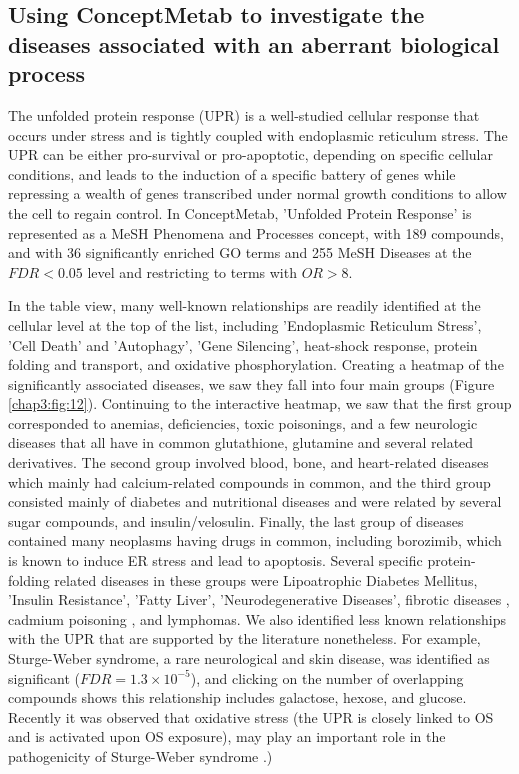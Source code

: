 \subsection{Using ConceptMetab to investigate the diseases associated with an aberrant biological process}
\label{conceptmetab_results_disease}

The unfolded protein response (UPR) is a well-studied cellular response that occurs under stress and is tightly coupled with endoplasmic reticulum stress. The UPR can be either pro-survival or pro-apoptotic, depending on specific cellular conditions, and leads to the induction of a specific battery of genes while repressing a wealth of genes transcribed under normal growth conditions to allow the cell to regain control. In ConceptMetab, 'Unfolded Protein Response' is represented as a MeSH Phenomena and Processes concept, with 189 compounds, and with 36 significantly enriched GO terms and 255 MeSH Diseases at the $FDR < 0.05$ level and restricting to terms with $OR > 8$.

In the table view, many well-known relationships are readily identified at the cellular level at the top of the list, including 'Endoplasmic Reticulum Stress', 'Cell Death' and 'Autophagy', 'Gene Silencing', heat-shock response, protein folding and transport, and oxidative phosphorylation. Creating a heatmap of the significantly associated diseases, we saw they fall into four main groups (Figure \ref{chap3:fig:12}). Continuing to the interactive heatmap, we saw that the first group corresponded to anemias, deficiencies, toxic poisonings, and a few neurologic diseases that all have in common glutathione, glutamine and several related derivatives. The second group involved blood, bone, and heart-related diseases which mainly had calcium-related compounds in common, and the third group consisted mainly of diabetes and nutritional diseases and were related by several sugar compounds, and insulin/velosulin. Finally, the last group of diseases contained many neoplasms having drugs in common, including borozimib, which is known to induce ER stress and lead to apoptosis. Several specific protein-folding related diseases in these groups were Lipoatrophic Diabetes Mellitus, 'Insulin Resistance', 'Fatty Liver', 'Neurodegenerative Diseases', fibrotic diseases \cite{Lenna:2012cy}, cadmium poisoning \cite{Gardarin:2010gs}, and lymphomas. We also identified less known relationships with the UPR that are supported by the literature nonetheless. For example, Sturge-Weber syndrome, a rare neurological and skin disease, was identified as significant ($FDR=1.3 \times 10^{-5}$), and clicking on the number of overlapping compounds shows this relationship includes galactose, hexose, and glucose. Recently it was observed that oxidative stress (the UPR is closely linked to OS and is activated upon OS exposure), may play an important role in the pathogenicity of Sturge-Weber syndrome \cite{Kadam:2012im}.)

